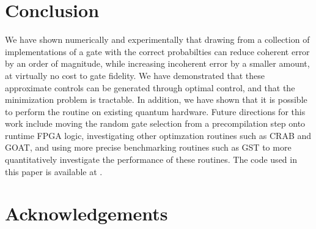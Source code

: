\documentclass[aps,nofootinbib,pra,notitlepage,twocolumn]{revtex4-1}
\begin{document}
\section{Conclusion}
We have shown numerically and experimentally that drawing from a collection of implementations of a gate with the correct probabilties can reduce coherent error by an order of magnitude, while increasing incoherent error by a smaller amount, at virtually no cost to gate fidelity. We have demonstrated that these approximate controls can be generated through optimal control, and that the minimization problem is tractable. In addition, we have shown that it is possible to perform the routine on existing quantum hardware. Future directions for this work include moving the random gate selection from a precompilation step onto runtime FPGA logic, investigating other optimzation routines such as CRAB \cite{Caneva2011} and GOAT\cite{Machnes2018}, and using more precise benchmarking routines such as GST\cite{BlumeKohout2017} to more quantitatively investigate the performance of these routines. The code used in this paper is available at \cite{decorrelating_errors}.

\section{Acknowledgements}




\end{document}
